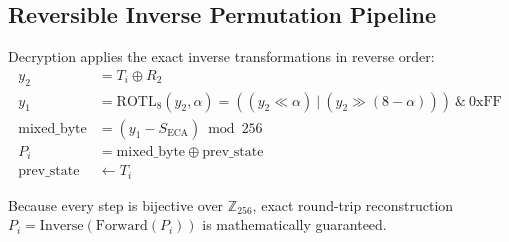 \subsection{Reversible Inverse Permutation Pipeline}
\label{subsec:inverse_permutation}
Decryption applies the exact inverse transformations in reverse order:
\begin{align}
y_2 &= T_i \oplus R_2 \label{eq:inv_rule_mix} \\
y_1 &= \text{ROTL}_8(y_2, \alpha) = ((y_2 \ll \alpha) \ |\  (y_2 \gg (8 - \alpha))) \ \& \ \text{0xFF} \label{eq:inv_rotr} \\
\text{mixed\_byte} &= (y_1 - S_{\text{ECA}}) \bmod 256 \label{eq:inv_mod} \\
P_i &= \text{mixed\_byte} \oplus \text{prev\_state} \label{eq:inv_chain} \\
\text{prev\_state} &\leftarrow T_i \label{eq:inv_feedback_update}
\end{align}

Because every step is bijective over $\mathbb{Z}_{256}$, exact round-trip reconstruction $P_i = \text{Inverse}(\text{Forward}(P_i))$ is mathematically guaranteed.
